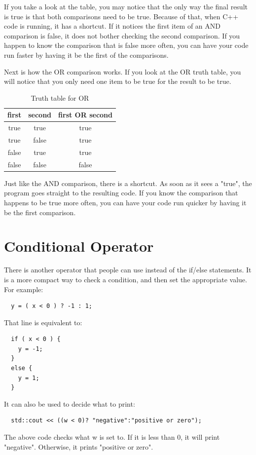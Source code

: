 If you take a look at the table, you may notice that the only way the final result is true is that both comparisons need to be true. Because of that, when C++ code is running, it has a shortcut. If it notices the first item of an AND comparison is false, it does not bother checking the second comparison. If you happen to know the comparison that is false more often, you can have your code run faster by having it be the first of the comparisons.

Next is how the OR comparison works. If you look at the OR truth table, you will notice that you only need one item to be true for the result to be true.
\vspace{0.1in}
\begin{table}[h]
\centering
\begin{tabular}{ | c | c | c | }
\hline
 first & second & first OR second \\\hline
 true & true & true \\ 
 true & false & true \\  
 false & true & true \\
 false & false & false \\
\hline
\end{tabular}
    \caption{Truth table for OR}
    \label{tab:ortruth}
\end{table}
\vspace{0.1in}
Just like the AND comparison, there is a shortcut. As soon as it sees a "true", the program goes straight to the resulting code. If you know the comparison that happens to be true more often, you can have your code run quicker by having it be the first comparison.

\section{Conditional Operator}
There is another operator that people can use instead of the 
if/else statements. It is a more compact way to check a condition,
and then set the appropriate value. For example:
\begin{lstlisting}
  y = ( x < 0 ) ? -1 : 1;
\end{lstlisting}
That line is equivalent to:
\begin{lstlisting}
  if ( x < 0 ) {
    y = -1;
  }
  else {
    y = 1;
  }
\end{lstlisting}
It can also be used to decide what to print:
\begin{lstlisting}
  std::cout << ((w < 0)? "negative":"positive or zero");
\end{lstlisting}
The above code checks what w is set to. If it is less than 0, it 
will print "negative". Otherwise, it prints "positive or zero".

